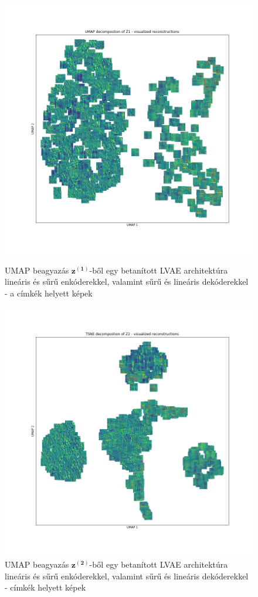 \documentclass[12pt, english]{article}
\begin{document}
\begin{figure}[H] 
  \begin{minipage}{0.48\linewidth}
    \centering
    \includegraphics[width=.7\linewidth]{umap_z1_dense_lin_lin_no_norm_textures.png}
    \caption{UMAP beagyazás $\bm{z^{(1)}}$-ből egy betanított LVAE architektúra lineáris és sűrű enkóderekkel, valamint sűrű és lineáris dekóderekkel - a címkék helyett képek}
    \label{fig:umap-z1-text}
  \end{minipage}\hfill
  \begin{minipage}{0.48\linewidth}
    \centering
    \includegraphics[width=.7\linewidth]{umap_z2_dense_lin_lin_no_norm_textures.png} 
    \caption{UMAP beagyazás $\bm{z^{(2)}}$-ből egy betanított LVAE architektúra lineáris és sűrű enkóderekkel, valamint sűrű és lineáris dekóderekkel - címkék helyett képek} 
    \label{fig:umap-z2-text}
  \end{minipage} 
\end{figure}
\end{document}
